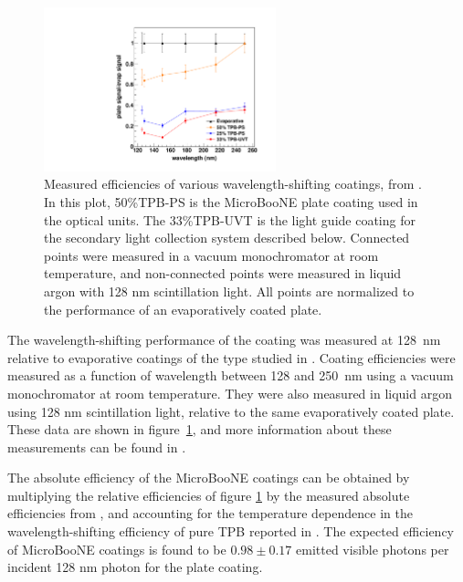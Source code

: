 \begin{figure}[t]
\centering 
\includegraphics[width=0.6\textwidth]{./light_figures/EfficienciesIgnarraThesis.pdf}
\caption{Measured efficiencies of various wavelength-shifting coatings, from \cite{Ignarra:2014-thesis}. In this plot, 50\%TPB-PS is the MicroBooNE plate coating used in the optical units.  The 33\%TPB-UVT is the light guide coating for the secondary light collection system described below.  Connected points were measured in a vacuum monochromator at room temperature, and non-connected points were measured in liquid argon with 128 nm scintillation light. All points are normalized to the performance of an evaporatively coated plate. \label{fig:CoatingEfficiency}  }
\end{figure}

The wavelength-shifting performance of the coating was measured at 128~nm relative to evaporative coatings of the type studied in \cite{Gehman:2011}.  Coating efficiencies were measured as a function of wavelength between 128 and 250~nm using a vacuum monochromator at room temperature.  They were also measured in liquid argon using 128 nm scintillation light, relative to the same evaporatively coated plate.  These data are shown in figure~\ref{fig:CoatingEfficiency}, and more information about these measurements can be found in \cite{Ignarra:2014-thesis}.  
  
The absolute efficiency of the MicroBooNE coatings can be obtained by multiplying the relative efficiencies of figure \ref{fig:CoatingEfficiency} by the measured absolute efficiencies from \cite{Gehman:2011}, and accounting for the temperature dependence in the wavelength-shifting efficiency of pure TPB reported in \cite{Francini:2013-jinst}.  The expected efficiency of MicroBooNE coatings is found to be $0.98 \pm 0.17$ emitted visible photons per incident 128 nm photon for the plate coating.


